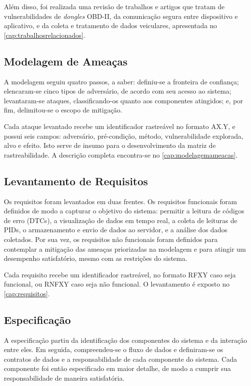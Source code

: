 Além disso, foi realizada uma revisão de trabalhos e artigos que tratam de vulnerabilidades de \textit{dongles} OBD-II, da comunicação segura entre dispositivo e aplicativo, e da coleta e tratamento de dados veiculares, apresentada no \autoref{cap:trabalhosrelacionados}.

\subsection{Modelagem de Ameaças}

A modelagem seguiu quatro passos, a saber: definiu-se a fronteira de confiança; elencaram-se cinco tipos de adversário, de acordo com seu acesso ao sistema; levantaram-se ataques, classificando-os quanto aos componentes atingidos; e, por fim, delimitou-se o escopo de mitigação.

Cada ataque levantado recebe um identificador rastreável no formato AX.Y, e possui seis campos: adversário, pré-condição, método, vulnerabilidade explorada, alvo e efeito. Isto serve de insumo para o desenvolvimento da matriz de rastreabilidade. A descrição completa encontra-se no \autoref{cap:modelagemameacas}.

\subsection{Levantamento de Requisitos}

Os requisitos foram levantados em duas frentes. Os requisitos funcionais foram definidos de modo a capturar o objetivo do sistema: permitir a leitura de códigos de erro (DTCs), a visualização de dados em tempo real, a coleta de leituras de PIDs, o armazenamento e envio de dados ao servidor, e a análise dos dados coletados. Por sua vez, os requisitos não funcionais foram definidos para contemplar a mitigação das ameaças priorizadas na modelagem e para atingir um desempenho satisfatório, mesmo com as restrições do sistema.

Cada requisito recebe um identificador rastreável, no formato RFXY caso seja funcional, ou RNFXY caso seja não funcional. O levantamento é exposto no \autoref{cap:requisitos}.

\subsection{Especificação}

A especificação partiu da identificação dos componentes do sistema e da interação entre eles. Em seguida, compreendeu-se o fluxo de dados e definiram-se os contratos de dados e a responsabilidade de cada componente do sistema. Cada componente foi então especificado em maior detalhe, de modo a cumprir sua responsabilidade de maneira satisfatória.

